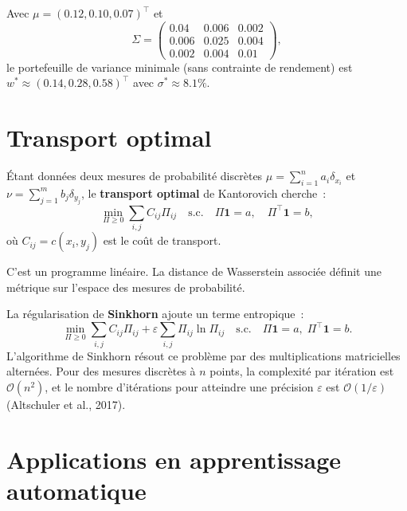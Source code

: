 \begin{exemple}
Avec $\mu = (0.12, 0.10, 0.07)^\top$ et
\[
  \Sigma = \begin{pmatrix}
    0.04 & 0.006 & 0.002 \\
    0.006 & 0.025 & 0.004 \\
    0.002 & 0.004 & 0.01
  \end{pmatrix},
\]
le portefeuille de variance minimale (sans contrainte de rendement) est
$w^* \approx (0.14, 0.28, 0.58)^\top$ avec $\sigma^* \approx 8.1\%$.
\end{exemple}

\section{Transport optimal}

\begin{definition}
\'Etant donn\'ees deux mesures de probabilit\'e discr\`etes
$\mu = \sum_{i=1}^n a_i \delta_{x_i}$ et
$\nu = \sum_{j=1}^m b_j \delta_{y_j}$, le \textbf{transport optimal} de
Kantorovich cherche~:
\[
  \min_{\Pi \geq 0} \sum_{i,j} C_{ij} \Pi_{ij} \quad \text{s.c.} \quad
  \Pi \mathbf{1} = a, \quad \Pi^\top \mathbf{1} = b,
\]
o\`u $C_{ij} = c(x_i, y_j)$ est le co\^ut de transport.
\end{definition}

\begin{remarque}
C'est un programme lin\'eaire. La distance de Wasserstein associ\'ee
d\'efinit une m\'etrique sur l'espace des mesures de probabilit\'e.
\end{remarque}

\begin{definition}
La r\'egularisation de \textbf{Sinkhorn} ajoute un terme entropique~:
\[
  \min_{\Pi \geq 0} \sum_{i,j} C_{ij} \Pi_{ij}
  + \varepsilon \sum_{i,j} \Pi_{ij} \ln \Pi_{ij} \quad
  \text{s.c.} \quad \Pi \mathbf{1} = a, \; \Pi^\top \mathbf{1} = b.
\]
L'algorithme de Sinkhorn r\'esout ce probl\`eme par des multiplications
matricielles altern\'ees. Pour des mesures discr\`etes \`a $n$ points,
la complexit\'e par it\'eration est $\mathcal{O}(n^2)$, et le nombre
d'it\'erations pour atteindre une pr\'ecision $\varepsilon$ est
$\mathcal{O}(1/\varepsilon)$ (Altschuler et al., 2017).
\end{definition}

\section{Applications en apprentissage automatique}

